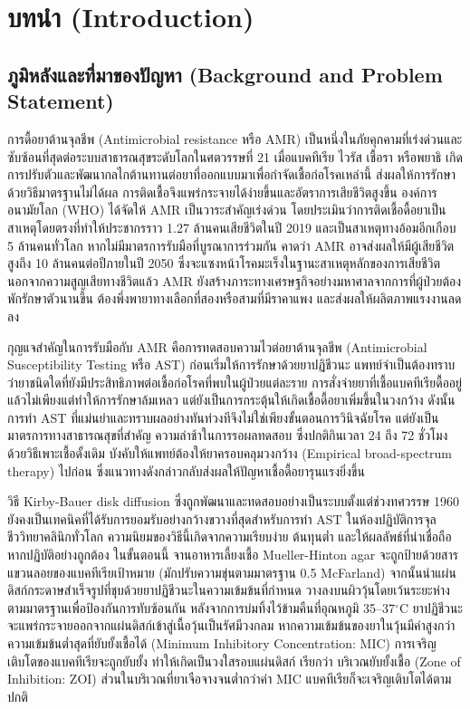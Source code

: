﻿%
\chapter{บทนำ (Introduction)}

\section{ภูมิหลังและที่มาของปัญหา (Background and Problem Statement)}

การดื้อยาต้านจุลชีพ (Antimicrobial resistance หรือ AMR) เป็นหนึ่งในภัยคุกคามที่เร่งด่วนและซับซ้อนที่สุดต่อระบบสาธารณสุขระดับโลกในศตวรรษที่ 21 เมื่อแบคทีเรีย ไวรัส เชื้อรา หรือพยาธิ เกิดการปรับตัวและพัฒนากลไกต้านทานต่อยาที่ออกแบบมาเพื่อกำจัดเชื้อก่อโรคเหล่านี้ ส่งผลให้การรักษาด้วยวิธีมาตรฐานไม่ได้ผล การติดเชื้อจึงแพร่กระจายได้ง่ายขึ้นและอัตราการเสียชีวิตสูงขึ้น องค์การอนามัยโลก (WHO) ได้จัดให้ AMR เป็นวาระสำคัญเร่งด่วน โดยประเมินว่าการติดเชื้อดื้อยาเป็นสาเหตุโดยตรงที่ทำให้ประชากรราว 1.27 ล้านคนเสียชีวิตในปี 2019 และเป็นสาเหตุทางอ้อมอีกเกือบ 5 ล้านคนทั่วโลก \cite{who_amr2022} หากไม่มีมาตรการรับมือที่บูรณาการร่วมกัน คาดว่า AMR อาจส่งผลให้มีผู้เสียชีวิตสูงถึง 10 ล้านคนต่อปีภายในปี 2050 ซึ่งจะแซงหน้าโรคมะเร็งในฐานะสาเหตุหลักของการเสียชีวิต นอกจากความสูญเสียทางชีวิตแล้ว AMR ยังสร้างภาระทางเศรษฐกิจอย่างมหาศาลจากการที่ผู้ป่วยต้องพักรักษาตัวนานขึ้น ต้องพึ่งพายาทางเลือกที่สองหรือสามที่มีราคาแพง และส่งผลให้ผลิตภาพแรงงานลดลง

กุญแจสำคัญในการรับมือกับ AMR คือการทดสอบความไวต่อยาต้านจุลชีพ (Antimicrobial Susceptibility Testing หรือ AST) ก่อนเริ่มให้การรักษาด้วยยาปฏิชีวนะ แพทย์จำเป็นต้องทราบว่ายาชนิดใดที่ยังมีประสิทธิภาพต่อเชื้อก่อโรคที่พบในผู้ป่วยแต่ละราย การสั่งจ่ายยาที่เชื้อแบคทีเรียดื้ออยู่แล้วไม่เพียงแต่ทำให้การรักษาล้มเหลว แต่ยังเป็นการกระตุ้นให้เกิดเชื้อดื้อยาเพิ่มขึ้นในวงกว้าง ดังนั้น การทำ AST ที่แม่นยำและทราบผลอย่างทันท่วงทีจึงไม่ใช่เพียงขั้นตอนการวินิจฉัยโรค แต่ยังเป็นมาตรการทางสาธารณสุขที่สำคัญ ความล่าช้าในการรอผลทดสอบ ซึ่งปกติกินเวลา 24 ถึง 72 ชั่วโมงด้วยวิธีเพาะเชื้อดั้งเดิม บังคับให้แพทย์ต้องให้ยาครอบคลุมวงกว้าง (Empirical broad-spectrum therapy) ไปก่อน ซึ่งแนวทางดังกล่าวกลับส่งผลให้ปัญหาเชื้อดื้อยารุนแรงยิ่งขึ้น

วิธี Kirby-Bauer disk diffusion ซึ่งถูกพัฒนาและทดสอบอย่างเป็นระบบตั้งแต่ช่วงทศวรรษ 1960 ยังคงเป็นเทคนิคที่ได้รับการยอมรับอย่างกว้างขวางที่สุดสำหรับการทำ AST ในห้องปฏิบัติการจุลชีววิทยาคลินิกทั่วโลก \cite{asm2009kirby,clsi2025} ความนิยมของวิธีนี้เกิดจากความเรียบง่าย ต้นทุนต่ำ และให้ผลลัพธ์ที่น่าเชื่อถือหากปฏิบัติอย่างถูกต้อง ในขั้นตอนนี้ จานอาหารเลี้ยงเชื้อ Mueller-Hinton agar จะถูกป้ายด้วยสารแขวนลอยของแบคทีเรียเป้าหมาย (มักปรับความขุ่นตามมาตรฐาน 0.5 McFarland) จากนั้นนำแผ่นดิสก์กระดาษสำเร็จรูปที่ชุบด้วยยาปฏิชีวนะในความเข้มข้นที่กำหนด วางลงบนผิววุ้นโดยเว้นระยะห่างตามมาตรฐานเพื่อป้องกันการทับซ้อนกัน หลังจากการบ่มทิ้งไว้ข้ามคืนที่อุณหภูมิ 35--37$^\circ$C ยาปฏิชีวนะจะแพร่กระจายออกจากแผ่นดิสก์เข้าสู่เนื้อวุ้นเป็นรัศมีวงกลม หากความเข้มข้นของยาในวุ้นมีค่าสูงกว่าความเข้มข้นต่ำสุดที่ยับยั้งเชื้อได้ (Minimum Inhibitory Concentration: MIC) การเจริญเติบโตของแบคทีเรียจะถูกยับยั้ง ทำให้เกิดเป็นวงใสรอบแผ่นดิสก์ เรียกว่า บริเวณยับยั้งเชื้อ (Zone of Inhibition: ZOI) ส่วนในบริเวณที่ยาเจือจางจนต่ำกว่าค่า MIC แบคทีเรียก็จะเจริญเติบโตได้ตามปกติ

